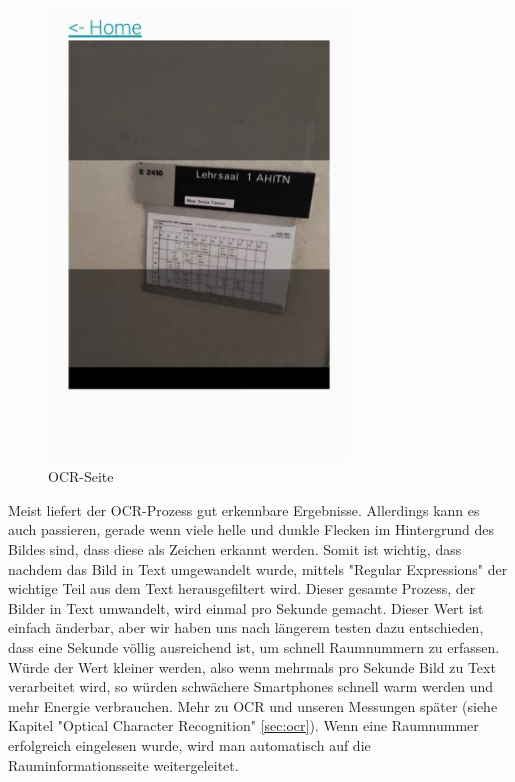 \begin{figure}[H]
    \centering
    \includegraphics[width=80mm]{media/WebComponents/OCRSeite_light.jpg}
    \caption{OCR-Seite}
\end{figure}


Meist liefert der OCR-Prozess gut erkennbare Ergebnisse. Allerdings kann es auch passieren, gerade wenn viele helle und dunkle Flecken im Hintergrund des Bildes sind, dass diese als Zeichen erkannt werden. Somit ist wichtig, dass nachdem das Bild in Text umgewandelt wurde, mittels "Regular Expressions" der wichtige Teil aus dem Text herausgefiltert wird. Dieser gesamte Prozess, der Bilder in Text umwandelt, wird einmal pro Sekunde gemacht. Dieser Wert ist einfach änderbar, aber wir haben uns nach längerem testen dazu entschieden, dass eine Sekunde völlig ausreichend ist, um schnell Raumnummern zu erfassen. Würde der Wert kleiner werden, also wenn mehrmals pro Sekunde Bild zu Text verarbeitet wird, so würden schwächere Smartphones schnell warm werden und mehr Energie verbrauchen. Mehr zu OCR und unseren Messungen später (siehe Kapitel "Optical Character Recognition" \ref{sec:ocr}). Wenn eine Raumnummer erfolgreich eingelesen wurde, wird man automatisch auf die Rauminformationsseite weitergeleitet.


